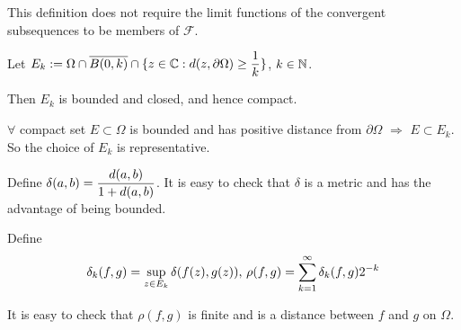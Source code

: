 \begin{remark}
    This definition does not require the limit functions of the convergent subsequences to be members of  $ \mathscr{F} $. 
\end{remark}
Let  $ E_k:=\Omega\cap \overline{B(0,k)}\cap \{z\in \mathbb C:d(z,\partial \Omega) \geq \displaystyle\frac{1}{k}\} $,  $ k\in \mathbb N $.

Then  $ E_k  $ is bounded and closed, and hence compact.

$ \forall  $ compact set  $ E\subset \Omega  $ is bounded and has positive distance from  $ \partial \Omega $ $ \Rightarrow  $  $ E\subset E_k $. So the choice of  $ E_k  $ is representative.

Define  $ \delta(a,b)=\displaystyle\frac{d(a,b)}{1+d(a,b)} $. It is easy to check that  $ \delta  $ is a metric and has the advantage of being bounded.

Define  \begin{equation}\label{eq:6.1.1:definition of delta_k in function space}
    \delta_k(f,g)=\displaystyle\sup_{z\in E_k}\delta(f(z),g(z)) ,\,\rho(f,g)=\displaystyle\sum_{k=1}^\infty\delta_k(f,g)2^{-k} 
\end{equation}

It is easy to check that  $ \rho(f,g) $ is finite and is a distance between  $ f $ and  $ g $ on  $ \Omega $.  


